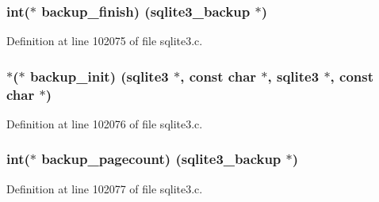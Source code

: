 \hypertarget{structsqlite3__api__routines_a816d793eaeccf7c741f3477cf90860c1}{}
\subsubsection[{backup\+\_\+finish}]{\setlength{\rightskip}{0pt plus 5cm}int($\ast$ backup\+\_\+finish) ({\bf sqlite3\+\_\+backup} $\ast$)}\label{structsqlite3__api__routines_a816d793eaeccf7c741f3477cf90860c1}


Definition at line 102075 of file sqlite3.\+c.

\hypertarget{structsqlite3__api__routines_a594f970b6a80732c2c51071207646d01}{}
\subsubsection[{backup\+\_\+init}]{$\ast$($\ast$ backup\+\_\+init) ({\bf sqlite3} $\ast$, const char $\ast$, {\bf sqlite3} $\ast$, const char $\ast$)}\label{structsqlite3__api__routines_a594f970b6a80732c2c51071207646d01}


Definition at line 102076 of file sqlite3.\+c.

\hypertarget{structsqlite3__api__routines_a62168e01fc680e06319aa85f7bc517b2}{}
\subsubsection[{backup\+\_\+pagecount}]{\setlength{\rightskip}{0pt plus 5cm}int($\ast$ backup\+\_\+pagecount) ({\bf sqlite3\+\_\+backup} $\ast$)}\label{structsqlite3__api__routines_a62168e01fc680e06319aa85f7bc517b2}


Definition at line 102077 of file sqlite3.\+c.

\hypertarget{structsqlite3__api__routines_a25c20bd7dd623a812864631e51727f1c}{}

